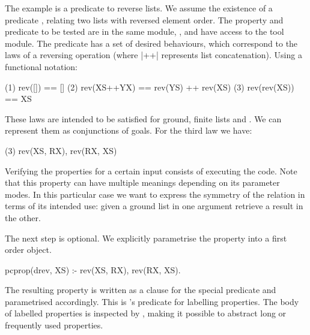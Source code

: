 The example is a predicate to reverse lists.
%
We assume the existence of a predicate , relating two lists
with reversed element order.
%
The property and predicate to be tested are in the same module,
, and %
have access to the \plqc{} tool module.
%
The  predicate has a set of desired behaviours, which
correspond to the laws of a reversing operation (where |++| 
represents list concatenation).%
%
Using a functional notation:
{
\begin{code}
(1)        rev([])     == []
(2)     rev(XS++YX)    == rev(YS) ++ rev(XS)
(3)      rev(rev(XS))  == XS
\end{code}
}
These laws are intended to be satisfied for ground, finite lists
 and .
%
We can represent
 them as conjunctions of \Prolog{} goals. %
For the third law we have:
%
\begin{yapcode}
  (3)  rev(XS, RX), rev(RX, XS)
\end{yapcode}
%
Verifying the properties for a certain input consists of
executing the code. %
%
Note that this property can have multiple meanings
depending on its parameter modes.
%
In this particular case we want to express the symmetry of the
 relation in terms of its intended use: given a ground
list in one argument retrieve a result in the other.


The next step is optional.
%
We explicitly parametrise the property into a first order object.
%
\begin{yapcode}
 pcprop({drev, XS}) :- rev(XS, RX), rev(RX, XS).
\end{yapcode}
%
The resulting property
is  written as a clause for the special
predicate  and parametrised accordingly.
%
This is \plqc{}'s predicate for labelling properties.
%
The body of labelled properties is inspected by \plqc{},
making it possible to abstract long or
frequently used properties.%


